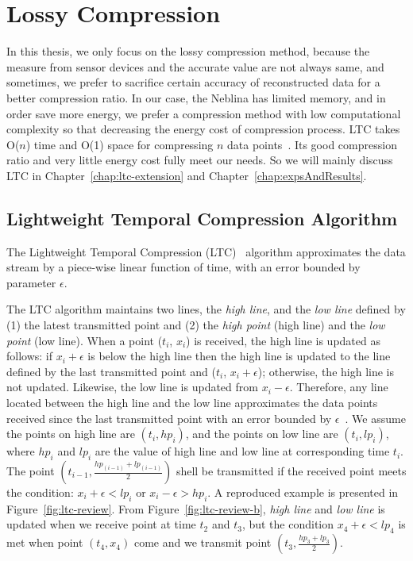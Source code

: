 \section{Lossy Compression}
\label{sec:lossy}

In this thesis, we only focus on the lossy compression method, because the
measure from sensor devices and the accurate value are not always same, and
sometimes, we prefer to sacrifice certain accuracy of reconstructed data for a
better compression ratio. In our case, the Neblina has limited memory, and in
order save more energy, we prefer a compression method with low computational
complexity so that decreasing the energy cost of compression process. LTC takes
O($n$) time and O(1) space for compressing $n$ data
points~\cite{schoellhammer2004lightweight}. Its good compression ratio and very
little energy cost fully meet our needs. So we will mainly discuss LTC in
Chapter~\ref{chap:ltc-extension} and Chapter~\ref{chap:expsAndResults}.

\subsection{Lightweight Temporal Compression Algorithm}
\label{sec:ltc}

The Lightweight Temporal Compression (LTC)~\cite{schoellhammer2004lightweight}
algorithm approximates the data stream by a piece-wise linear function of time,
with an error bounded by parameter $\epsilon$.

The LTC algorithm maintains two lines, the \emph{high line}, and the \emph{low
line} defined by (1) the latest transmitted point and (2) the \emph{high point}
(high line) and the \emph{low point} (low line). When a point ($t_i$, $x_i$) is
received, the high line is updated as follows: if $x_i+\epsilon$ is below the
high line then the high line is updated to the line defined by the last
transmitted point and ($t_i$, $x_i+\epsilon$); otherwise, the high line is not
updated. Likewise, the low line is updated from $x_i-\epsilon$. Therefore, any
line located between the high line and the low line approximates the data points
received since the last transmitted point with an error bounded by
$\epsilon$~\cite{schoellhammer2004lightweight}. We assume the points on high
line are $(t_i, hp_i)$, and the points on low line are $(t_i, lp_i)$, where
$hp_i$ and $lp_i$ are the value of high line and low line at corresponding time
$t_i$.
The point $(t_{i-1}, \frac{hp_{(i-1)}+lp_{(i-1)}}{2})$ shell be transmitted if the
received point meets the condition: $x_i+\epsilon < lp_{i}$ or $x_i-\epsilon >
hp_{i}$. A reproduced example is presented in Figure~\ref{fig:ltc-review}. From
Figure~\ref{fig:ltc-review-b}, \emph{high line} and \emph{low line} is updated
when we receive point at time $t_2$ and $t_3$, but the condition $x_4+\epsilon <
lp_{4}$ is met when point $(t_4, x_4)$ come and we transmit point $(t_3,
\frac{hp_{3}+lp_{3}}{2})$.

